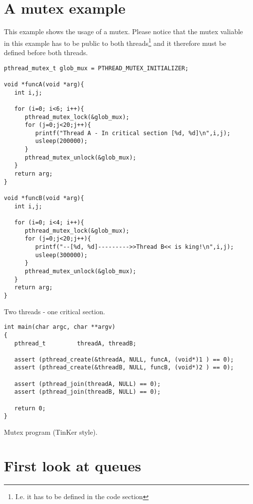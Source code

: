\chapter{A mutex example}
This example shows the usage of a mutex. Please notice that the mutex valiable in this example has to be public to both threads\footnote{I.e. it has to be defined in the code section} and it therefore must be defined before both threads.

\begin{table}[!hbp]
\begin{verbatim}
pthread_mutex_t glob_mux = PTHREAD_MUTEX_INITIALIZER;

void *funcA(void *arg){
   int i,j;

   for (i=0; i<6; i++){
      pthread_mutex_lock(&glob_mux);
      for (j=0;j<20;j++){
         printf("Thread A - In critical section [%d, %d]\n",i,j);
         usleep(200000);
      }
      pthread_mutex_unlock(&glob_mux);
   }
   return arg;
}

void *funcB(void *arg){
   int i,j;

   for (i=0; i<4; i++){
      pthread_mutex_lock(&glob_mux);
      for (j=0;j<20;j++){
         printf("--[%d, %d]--------->>Thread B<< is king!\n",i,j);
         usleep(300000);
      }
      pthread_mutex_unlock(&glob_mux);
   }
   return arg;
}
\end{verbatim}
\caption{Two threads - one critical section.\label{mutex_threads}}
\end{table}

\begin{table}[!hbp]
\begin{verbatim}
int main(char argc, char **argv)
{
   pthread_t         threadA, threadB;   

   assert (pthread_create(&threadA, NULL, funcA, (void*)1 ) == 0);
   assert (pthread_create(&threadB, NULL, funcB, (void*)2 ) == 0);

   assert (pthread_join(threadA, NULL) == 0);
   assert (pthread_join(threadB, NULL) == 0);

   return 0;
}
\end{verbatim}
\caption{Mutex program (TinKer style).\label{mutex1}}
\end{table}
\chapter{First look at queues}

